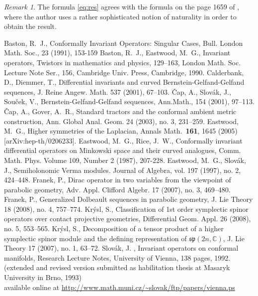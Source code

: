 \documentclass[final]{birkmult}
\theoremstyle{definition}
\theoremstyle{remark}
\newtheorem{remark}[theorem]{Remark}
\numberwithin{equation}{section}
\begin{document}
\begin{remark}
 The formula \eqref{eq:res} agrees with the formula on the page 1659 of \cite{Eastwood}, where the author uses a rather sophisticated notion of naturality in order to obtain the result.
\end{remark}


\begin{thebibliography}{99}
 Baston, R.~J., Conformally Invariant Operators: Singular Cases, Bull. London Math. Soc., 23 (1991), 153-159
 Baston, R.~J., Eastwood, M.~G., Invariant operators,  Twistors in mathematics and physics,  129--163, London Math. Soc. Lecture Note Ser., 156, Cambridge Univ. Press, Cambridge, 1990.
 Calderbank, D., Diemmer, T., Differential invariants and curved Bernstein-Gelfand-Gelfand sequences, J. Reine Angew. Math. 537 (2001), 67--103.
 \v{C}ap, A., Slov\'ak, J., Sou\v cek, V., Bernstein-Gelfand-Gelfand sequences, Ann.Math., 154 (2001), 97--113. 
 \v{C}ap, A., Gover, A.~R., Standard tractors and the conformal ambient metric construction, Ann. Global Anal. Geom. 24 (2003), no. 3, 231--259.
  Eastwood, M.~G.,  Higher symmetries of the Laplacian, Annals Math.\  {\bf 161}, 1645 (2005) [arXiv:hep-th/0206233].
  Eastwood, M.~G.,  Rice, J.~W., Conformally invariant differential operators on Minkowski space and their curved analogues,  Comm. Math. Phys. Volume 109, Number 2 (1987), 207-228.
  Eastwood, M.~G., Slov\'ak, J., Semiholonomic Verma modules. Journal of Algebra,  vol. 197 (1997), no. 2, 424--448.
 Franek, P., Dirac operator in two variables from the viewpoint of parabolic geometry, Adv. Appl. Clifford Algebr. 17 (2007), no. 3, 469--480.
 Franek, P., Generalized Dolbeault sequences in parabolic geometry, J. Lie Theory 18 (2008), no. 4, 757--774.
 Kr\'ysl, S., Classification of 1st order symplectic spinor operators over contact projective geometries, Differential Geom. Appl. 26 (2008), no. 5, 553--565.
 Kr\'ysl, S., Decomposition of a tensor product of a higher symplectic spinor module and the defining representation of ${\mathfrak{sp}}(2n,\mathbb{C})$, J. Lie Theory 17 (2007), no. 1, 63--72.
 Slov\'ak, J. , Invariant operators on conformal manifolds, Research Lecture Notes, University of Vienna, 138 pages, 1992. (extended and revised version submitted as habilitation thesis at Masaryk University in Brno, 1993) \\
 available online at \url{http://www.math.muni.cz/~slovak/ftp/papers/vienna.ps}
\end{thebibliography}
\end{document}
